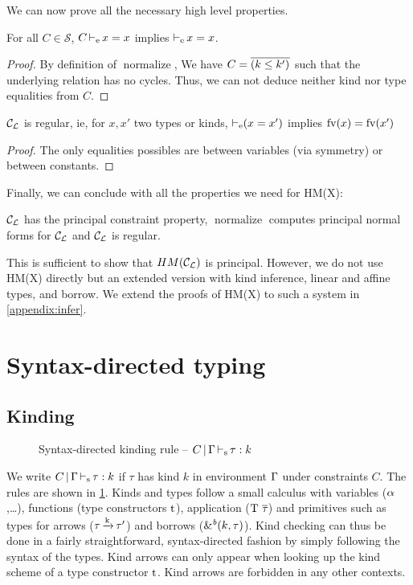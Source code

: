 We can now prove all the necessary high level properties.

\begin{lemma}
  For all $C\in\mathcal S$, $C \operatorname{\vdash_e} x = x$ implies
  $\operatorname{\vdash_e} x = x$.
\end{lemma}
\begin{proof}
  By definition of $\operatorname{normalize}$, We have $C = \overline{(k \leq k')_{{}}}$
  such that the underlying relation has no cycles.
  Thus, we can not deduce neither kind nor type equalities from $C$.
\end{proof}

\begin{property}
  ${\mathcal C_{\mathcal L}}$ is regular, ie, for $x, x'$ two types or kinds,
  $\operatorname{\vdash_e} (x = x')$ implies
  $\operatorname{fv}(x) = \operatorname{fv}(x')$
\end{property}
\begin{proof}
  The only equalities possibles are between variables (via symmetry) or
  between constants.
\end{proof}

Finally, we can conclude with all the properties we need for
HM(X):

\begin{theorem}
  ${\mathcal C_{\mathcal L}}$ has the principal constraint property,
  $\operatorname{normalize}$ computes principal normal forms for ${\mathcal C_{\mathcal L}}$
  and ${\mathcal C_{\mathcal L}}$ is regular.
\end{theorem}


This is sufficient to show that $HM({\mathcal C_{\mathcal L}})$ is principal. However,
we do not use HM(X) directly but an extended version with kind inference,
linear and affine types, and borrow.
We extend the proofs of HM(X) to such a system in \cref{appendix:infer}.


\section{Syntax-directed typing}
\label{appendix:sdtyping}

\subsection{Kinding}
%
\begin{figure}[bt]
  \centering
  
  \caption{Syntax-directed kinding rule --
    $C \operatorname{|} \Gamma \operatorname{\vdash_s} \tau : k$}
  \label{rules:sd-kinding}
\end{figure}

We write $C \operatorname{|} \Gamma \operatorname{\vdash_s} \tau : k$
if $\tau$ has kind $k$ in environment $\Gamma$ under constraints $C$.
The rules are shown in \cref{rules:sd-kinding}.
Kinds and types follow a small calculus with variables ($\alpha$,\dots),
functions (type constructors $\mathrm{t}$), application ($\mathrm{\mathrm{T}}\ \overline{\tau_{{}}}$)
and primitives such as types for arrows ($\tau\operatorname{\xrightarrow{k}}\tau'$) and
borrows (${\&}^{\textit{b}}(k,\tau)$).
Kind checking can thus be done in a fairly straightforward, syntax-directed
fashion by simply following
the syntax of the types. Kind arrows can only appear when looking
up the kind scheme of a type constructor $\mathrm{t}$. Kind arrows are forbidden
in any other contexts.

